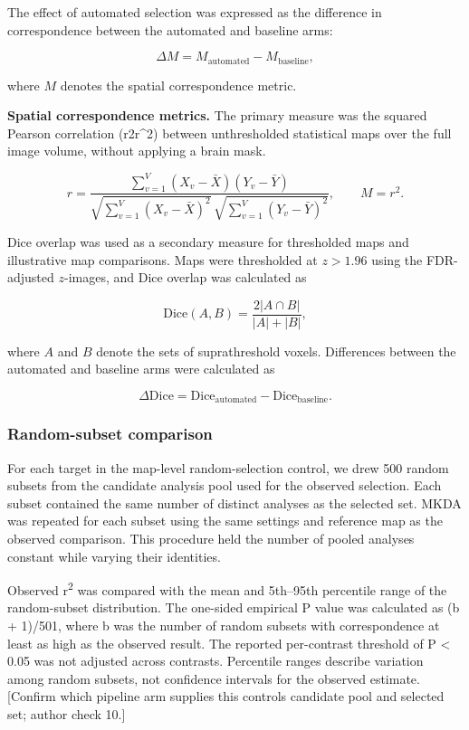 The effect of automated selection was expressed as the difference in correspondence between the automated and baseline arms:

\begin{equation*}
\Delta M = M_{\mathrm{automated}} - M_{\mathrm{baseline}},
\end{equation*}

where $M$ denotes the spatial correspondence metric.

\textbf{Spatial correspondence metrics.} The primary measure was the squared Pearson correlation (r2r\^{}2) between unthresholded statistical maps over the full image volume, without applying a brain mask.

\begin{equation*}
r = \frac{\sum_{v=1}^{V}(X_v-\bar X)(Y_v-\bar Y)}{\sqrt{\sum_{v=1}^{V}(X_v-\bar X)^2}\,\sqrt{\sum_{v=1}^{V}(Y_v-\bar Y)^2}},\qquad M=r^2.
\end{equation*}

Dice overlap was used as a secondary measure for thresholded maps and illustrative map comparisons. Maps were thresholded at $z > 1.96$ using the FDR-adjusted $z$-images, and Dice overlap was calculated as

\begin{equation*}
\mathrm{Dice}(A,B) = \frac{2|A\cap B|}{|A|+|B|},
\end{equation*}

where $A$ and $B$ denote the sets of suprathreshold voxels. Differences between the automated and baseline arms were calculated as

\begin{equation*}
\Delta\mathrm{Dice} = \mathrm{Dice}_{\mathrm{automated}} - \mathrm{Dice}_{\mathrm{baseline}}.
\end{equation*}

\subsubsection{Random-subset comparison}

For each target in the map-level random-selection control, we drew 500 random subsets from the candidate analysis pool used for the observed selection. Each subset contained the same number of distinct analyses as the selected set. MKDA was repeated for each subset using the same settings and reference map as the observed comparison. This procedure held the number of pooled analyses constant while varying their identities.

Observed r\textsuperscript{2} was compared with the mean and 5th--95th percentile range of the random-subset distribution. The one-sided empirical P value was calculated as (b + 1)/501, where b was the number of random subsets with correspondence at least as high as the observed result. The reported per-contrast threshold of P \textless{} 0.05 was not adjusted across contrasts. Percentile ranges describe variation among random subsets, not confidence intervals for the observed estimate. {[}Confirm which pipeline arm supplies this control\textquotesingle s candidate pool and selected set; author check 10.{]}

